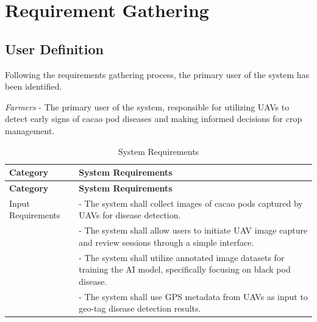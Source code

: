 \section{Requirement Gathering}

\subsection*{User Definition}

Following the requirements gathering process, the primary user of the system has been identified.

\textit{Farmers} - The primary user of the system, responsible for utilizing UAVs to detect early signs of cacao pod diseases and making informed decisions for crop management.

\begin{longtable}{p{4cm} p{8cm}}
	\caption{System Requirements} \label{tab:sysreq}                                                                                                                                      \\

	\toprule
	\textbf{Category}        & \textbf{System Requirements}                                                                                                                               \\
	\midrule
	\endfirsthead

	\toprule
	\textbf{Category}        & \textbf{System Requirements}                                                                                                                               \\
	\midrule
	\endhead

	\bottomrule
	\endfoot

	Input Requirements       & - The system shall collect images of cacao pods captured by UAVs for disease detection.                                                                    \\
	                         & - The system shall allow users to initiate UAV image capture and review sessions through a simple interface.                                               \\
	                         & - The system shall utilize annotated image datasets for training the AI model, specifically focusing on black pod disease.                                 \\
	                         & - The system shall use GPS metadata from UAVs as input to geo-tag disease detection results.                                                               \\
	\midrule


\end{longtable}
